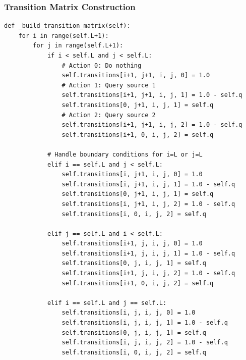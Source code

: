 \documentclass[12pt]{article}
\begin{document}
\subsubsection{Transition Matrix Construction}
\begin{lstlisting}[caption=Transition Probability Matrix Construction]
def _build_transition_matrix(self):
    for i in range(self.L+1):
        for j in range(self.L+1):
            if i < self.L and j < self.L:
                # Action 0: Do nothing
                self.transitions[i+1, j+1, i, j, 0] = 1.0
                # Action 1: Query source 1
                self.transitions[i+1, j+1, i, j, 1] = 1.0 - self.q
                self.transitions[0, j+1, i, j, 1] = self.q
                # Action 2: Query source 2
                self.transitions[i+1, j+1, i, j, 2] = 1.0 - self.q
                self.transitions[i+1, 0, i, j, 2] = self.q
            
            # Handle boundary conditions for i=L or j=L
            elif i == self.L and j < self.L:
                self.transitions[i, j+1, i, j, 0] = 1.0
                self.transitions[i, j+1, i, j, 1] = 1.0 - self.q
                self.transitions[0, j+1, i, j, 1] = self.q
                self.transitions[i, j+1, i, j, 2] = 1.0 - self.q
                self.transitions[i, 0, i, j, 2] = self.q
            
            elif j == self.L and i < self.L:
                self.transitions[i+1, j, i, j, 0] = 1.0
                self.transitions[i+1, j, i, j, 1] = 1.0 - self.q
                self.transitions[0, j, i, j, 1] = self.q
                self.transitions[i+1, j, i, j, 2] = 1.0 - self.q
                self.transitions[i+1, 0, i, j, 2] = self.q
            
            elif i == self.L and j == self.L:
                self.transitions[i, j, i, j, 0] = 1.0
                self.transitions[i, j, i, j, 1] = 1.0 - self.q
                self.transitions[0, j, i, j, 1] = self.q
                self.transitions[i, j, i, j, 2] = 1.0 - self.q
                self.transitions[i, 0, i, j, 2] = self.q
\end{lstlisting}
\end{document}

